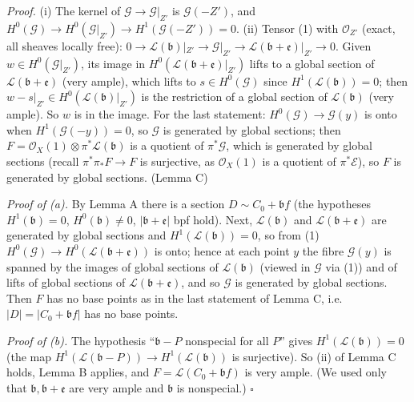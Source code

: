 \documentclass[11pt]{article}
\begin{document}
\emph{Proof.} (i) The kernel of $\mathcal G\to\mathcal G|_{Z'}$ is $\mathcal G(-Z')$, and $H^0(\mathcal G)\to H^0(\mathcal G|_{Z'})\to H^1(\mathcal G(-Z'))=0$. (ii) Tensor (1) with $\mathcal O_{Z'}$ (exact, all sheaves locally free): $0\to\mathcal L(\mathfrak b)|_{Z'}\to\mathcal G|_{Z'}\to\mathcal L(\mathfrak b+\mathfrak e)|_{Z'}\to0$. Given $w\in H^0(\mathcal G|_{Z'})$, its image in $H^0(\mathcal L(\mathfrak b+\mathfrak e)|_{Z'})$ lifts to a global section of $\mathcal L(\mathfrak b+\mathfrak e)$ (very ample), which lifts to $s\in H^0(\mathcal G)$ since $H^1(\mathcal L(\mathfrak b))=0$; then $w-s|_{Z'}\in H^0(\mathcal L(\mathfrak b)|_{Z'})$ is the restriction of a global section of $\mathcal L(\mathfrak b)$ (very ample). So $w$ is in the image. For the last statement: $H^0(\mathcal G)\to\mathcal G(y)$ is onto when $H^1(\mathcal G(-y))=0$, so $\mathcal G$ is generated by global sections; then $F=\mathcal O_X(1)\otimes\pi^*\mathcal L(\mathfrak b)$ is a quotient of $\pi^*\mathcal G$, which is generated by global sections (recall $\pi^*\pi_*F\to F$ is surjective, as $\mathcal O_X(1)$ is a quotient of $\pi^*\mathcal E$), so $F$ is generated by global sections. \hfill(Lemma C)

\emph{Proof of (a).} By Lemma A there is a section $D\sim C_0+\mathfrak bf$ (the hypotheses $H^1(\mathfrak b)=0$, $H^0(\mathfrak b)\ne0$, $|\mathfrak b+\mathfrak e|$ bpf hold). Next, $\mathcal L(\mathfrak b)$ and $\mathcal L(\mathfrak b+\mathfrak e)$ are generated by global sections and $H^1(\mathcal L(\mathfrak b))=0$, so from (1) $H^0(\mathcal G)\to H^0(\mathcal L(\mathfrak b+\mathfrak e))$ is onto; hence at each point $y$ the fibre $\mathcal G(y)$ is spanned by the images of global sections of $\mathcal L(\mathfrak b)$ (viewed in $\mathcal G$ via (1)) and of lifts of global sections of $\mathcal L(\mathfrak b+\mathfrak e)$, and so $\mathcal G$ is generated by global sections. Then $F$ has no base points as in the last statement of Lemma C, i.e.\ $|D|=|C_0+\mathfrak bf|$ has no base points.

\emph{Proof of (b).} The hypothesis ``$\mathfrak b-P$ nonspecial for all $P$'' gives $H^1(\mathcal L(\mathfrak b))=0$ (the map $H^1(\mathcal L(\mathfrak b-P))\to H^1(\mathcal L(\mathfrak b))$ is surjective). So (ii) of Lemma C holds, Lemma B applies, and $F=\mathcal L(C_0+\mathfrak bf)$ is very ample. (We used only that $\mathfrak b,\mathfrak b+\mathfrak e$ are very ample and $\mathfrak b$ is nonspecial.) \hfill$\square$
\end{document}
